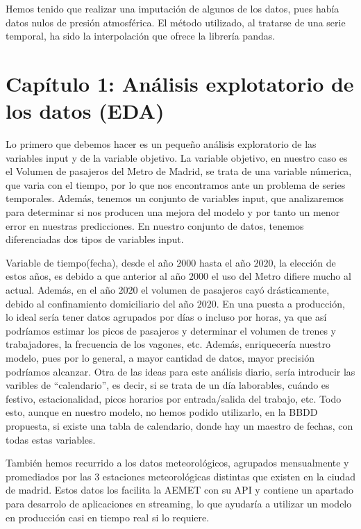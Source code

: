 \documentclass[11pt]{article}
\begin{document}
Hemos tenido que realizar una imputación de algunos de los datos, pues
había datos nulos de presión atmosférica. El método utilizado, al
tratarse de una serie temporal, ha sido la interpolación que ofrece la
librería pandas.

    \hypertarget{capuxedtulo-1-anuxe1lisis-explotatorio-de-los-datos-eda}{%
\section{Capítulo 1: Análisis explotatorio de los datos
(EDA)}\label{capuxedtulo-1-anuxe1lisis-explotatorio-de-los-datos-eda}}

    Lo primero que debemos hacer es un pequeño análisis exploratorio de las
variables input y de la variable objetivo. La variable objetivo, en
nuestro caso es el Volumen de pasajeros del Metro de Madrid, se trata de
una variable númerica, que varia con el tiempo, por lo que nos
encontramos ante un problema de series temporales. Además, tenemos un
conjunto de variables input, que analizaremos para determinar si nos
producen una mejora del modelo y por tanto un menor error en nuestras
predicciones. En nuestro conjunto de datos, tenemos diferenciadas dos
tipos de variables input.

Variable de tiempo(fecha), desde el año \(2000\) hasta el año \(2020\),
la elección de estos años, es debido a que anterior al año \(2000\) el
uso del Metro difiere mucho al actual. Además, en el año \(2020\) el
volumen de pasajeros cayó drásticamente, debido al confinamiento
domiciliario del año \(2020\). En una puesta a producción, lo ideal
sería tener datos agrupados por días o incluso por horas, ya que así
podríamos estimar los picos de pasajeros y determinar el volumen de
trenes y trabajadores, la frecuencia de los vagones, etc. Además,
enriquecería nuestro modelo, pues por lo general, a mayor cantidad de
datos, mayor precisión podríamos alcanzar. Otra de las ideas para este
análisis diario, sería introducir las varibles de ``calendario'', es
decir, si se trata de un día laborables, cuándo es festivo,
estacionalidad, picos horarios por entrada/salida del trabajo, etc. Todo
esto, aunque en nuestro modelo, no hemos podido utilizarlo, en la BBDD
propuesta, si existe una tabla de calendario, donde hay un maestro de
fechas, con todas estas variables.

También hemos recurrido a los datos meteorológicos, agrupados
mensualmente y promediados por las \(3\) estaciones meteorológicas
distintas que existen en la ciudad de madrid. Estos datos los facilita
la AEMET con su API y contiene un apartado para desarrolo de
aplicaciones en streaming, lo que ayudaría a utilizar un modelo en
producción casi en tiempo real si lo requiere.
\end{document}
